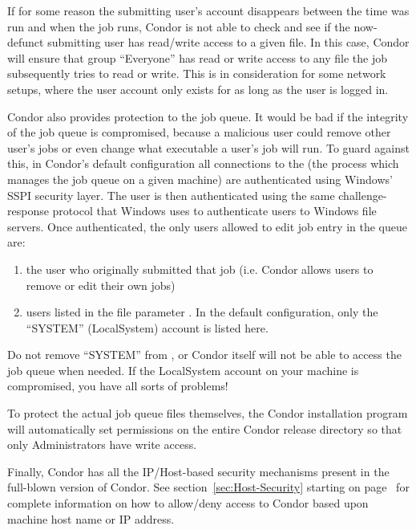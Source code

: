 If for some reason the submitting user's account disappears between the time
 was run and when the job runs, Condor is not able to check
and see if the now-defunct submitting user has read/write access to a given
file.  In this case, Condor will ensure that group ``Everyone'' has read or
write access to any file the job subsequently tries to read or write.  This
is in consideration for some network setups, where the user account only
exists for as long as the user is logged in.

Condor also provides protection to the job queue.  It would be bad if the
integrity of the job queue is compromised, because a malicious user could
remove other user's jobs or even change what executable a user's job will
run.  To guard against this, in Condor's default configuration all connections to the  (the
process which manages the job queue on a given machine) are authenticated
using Windows' SSPI security layer.  The user is then authenticated
using the same challenge-response protocol that Windows uses to authenticate
users to Windows file servers.  Once authenticated, the only users
allowed to edit job entry in the queue are:
\begin{enumerate}
\item the user who originally submitted that job (i.e. Condor allows users
to remove or edit their own jobs)
\item users listed in the  file parameter
.  In the default configuration, only the
``SYSTEM'' (LocalSystem) account is listed here.  
\end{enumerate}
\Warn Do not remove ``SYSTEM'' from , or
Condor itself will not be able to access the job queue when needed.  If the
LocalSystem account on your machine is compromised, you have all sorts of
problems!

To protect the actual job queue files themselves, the Condor installation
program will automatically set permissions on the entire Condor release
directory so that only Administrators have write access.

Finally, Condor has all the IP/Host-based security mechanisms present
in the full-blown version of Condor.  See section~\ref{sec:Host-Security}
starting on page~\pageref{sec:Host-Security} for complete information
on how to allow/deny access to Condor based upon machine host name or
IP address.


